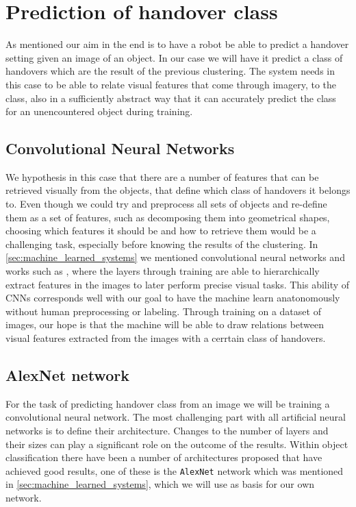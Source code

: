%
%


\section{Prediction of handover class}

As mentioned our aim in the end is to have a robot be able to predict a handover setting given an image of an object. In our case we will have it predict a class of handovers which are the result of the previous clustering. The system needs in this case to be able to relate visual features that come through imagery, to the class, also in a sufficiently abstract way that it can accurately predict the class for an unencountered object during training.

\subsection{Convolutional Neural Networks}

We hypothesis in this case that there are a number of features that can be retrieved visually from the objects, that define which class of handovers it belongs to. Even though we could try and preprocess all sets of objects and re-define them as a set of features, such as decomposing them into geometrical shapes, choosing which features it should be and how to retrieve them would be a challenging task, especially before knowing the results of the clustering. In \ref{sec:machine_learned_systems} we mentioned convolutional neural networks and works such as \parencite{Lee2009}, \parencite{Turaga2010} where the layers through training are able to hierarchically extract features in the images to later perform precise visual tasks. This ability of CNNs corresponds well with our goal to have the machine learn anatonomously without human preprocessing or labeling. Through training on a dataset of images, our hope is that the machine will be able to draw relations between visual features extracted from the images with a cerrtain class of handovers.

\subsection{AlexNet network}

For the task of predicting handover class from an image we will be training a convolutional neural network. The most challenging part with all artificial neural networks is to define their architecture. Changes to the number of layers and their sizes can play a significant role on the outcome of the results. Within object classification there have been a number of architectures proposed that have achieved good results, one of these is the \texttt{AlexNet} network which was mentioned in \ref{sec:machine_learned_systems}, which we will use as basis for our own network.

